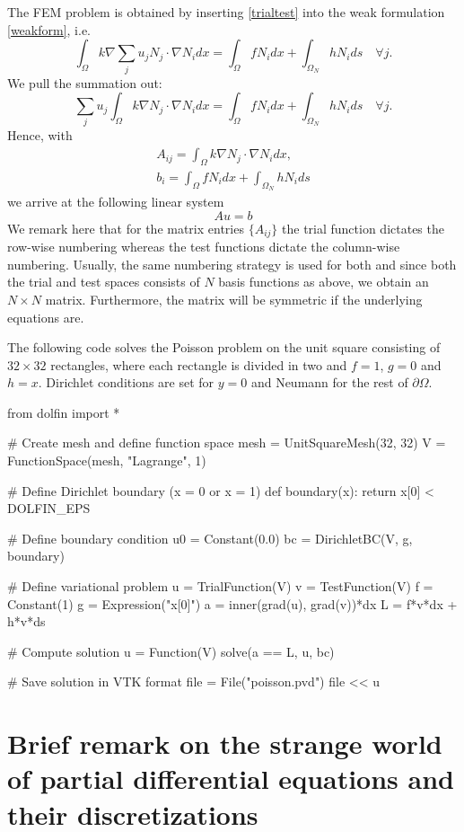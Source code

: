 The FEM problem is obtained by inserting \eqref{trialtest} into the weak formulation \eqref{weakform}, i.e.   
\[
\int_\Omega k \nabla \sum_j u_j N_j  \cdot \nabla N_i dx = \int_\Omega f N_i dx + \int_{\Omega_N} h N_i ds  \quad \forall j .    
\]
We pull the summation out: 
\[
\sum_j u_j  \int_\Omega k \nabla  N_j  \cdot \nabla N_i dx = \int_\Omega f N_i dx + \int_{\Omega_N} h N_i ds \quad \forall j.    
\]
Hence, with  
\begin{eqnarray*}
A_{ij} = \int_\Omega k \nabla  N_j  \cdot \nabla N_i dx, \\  
b_i = \int_\Omega f N_i dx + \int_{\Omega_N} h N_i ds 
\end{eqnarray*}
we arrive at the following linear system 
\[
A u = b 
\]
We remark here that for the matrix entries $\{A_{ij}\}$ the trial function dictates the
row-wise numbering whereas the test functions dictate the column-wise numbering. Usually, the same 
numbering strategy is used for both and since both the trial and test spaces consists of $N$ basis functions as above, we obtain an $N\times N$ matrix. 
Furthermore,  the matrix will be symmetric if the underlying equations are. 

The following code solves the Poisson problem on the unit square
consisting of $32\times 32$ rectangles, where each rectangle is divided
in two and $f=1$, $g=0$ and $h=x$. Dirichlet conditions are set 
for $y=0$ and Neumann for the rest of $\partial \Omega$.  

\begin{python}
from dolfin import *

# Create mesh and define function space
mesh = UnitSquareMesh(32, 32)
V = FunctionSpace(mesh, "Lagrange", 1)

# Define Dirichlet boundary (x = 0 or x = 1)
def boundary(x): return x[0] < DOLFIN_EPS 

# Define boundary condition
u0 = Constant(0.0)
bc = DirichletBC(V, g, boundary)

# Define variational problem
u = TrialFunction(V)
v = TestFunction(V)
f = Constant(1)
g = Expression("x[0]")
a = inner(grad(u), grad(v))*dx
L = f*v*dx + h*v*ds

# Compute solution
u = Function(V)
solve(a == L, u, bc)

# Save solution in VTK format
file = File("poisson.pvd")
file << u
\end{python}

\section{Brief remark on the strange world of partial differential equations and their discretizations }

